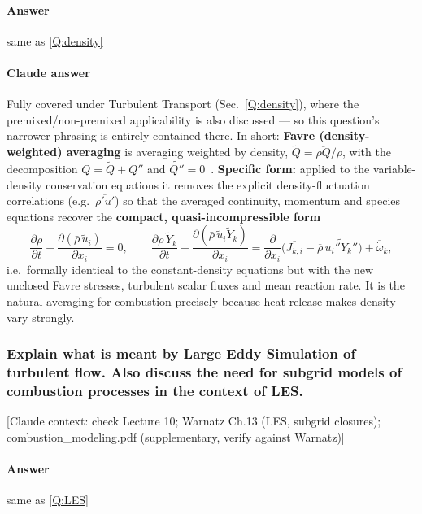 \paragraph{Answer} same as \ref{Q:density}

{\color{istblue}
\paragraph{Claude answer}
Fully covered under Turbulent Transport (Sec.~\ref{Q:density}), where the premixed/non-premixed applicability is also discussed --- so this question's narrower phrasing is entirely contained there. In short: \textbf{Favre (density-weighted) averaging} is averaging weighted by density, $\tilde Q = \overline{\rho Q}/\bar\rho$, with the decomposition $Q = \tilde Q + Q''$ and $\widetilde{Q''}=0$~\cite{lecture10,veynante2002turbulent,warnatz2006combustion}. \textbf{Specific form:} applied to the variable-density conservation equations it removes the explicit density-fluctuation correlations (e.g.\ $\overline{\rho'u'}$) so that the averaged continuity, momentum and species equations recover the \textbf{compact, quasi-incompressible form}
\begin{equation*}
\frac{\partial \bar\rho}{\partial t} + \frac{\partial(\bar\rho\,\tilde u_i)}{\partial x_i} = 0, \qquad
\frac{\partial \bar\rho\,\tilde Y_k}{\partial t} + \frac{\partial(\bar\rho\,\tilde u_i\tilde Y_k)}{\partial x_i} = \frac{\partial}{\partial x_i}\Big(\overline{J_{k,i}} - \overline{\rho}\,\widetilde{u_i''Y_k''}\Big) + \overline{\dot\omega}_k,
\end{equation*}
i.e.\ formally identical to the constant-density equations but with the new unclosed Favre stresses, turbulent scalar fluxes and mean reaction rate. It is the natural averaging for combustion precisely because heat release makes density vary strongly.
}




\subsubsection{Explain what is meant by Large Eddy Simulation of turbulent flow. Also discuss the need for subgrid models of combustion processes in the context of LES.}

{\color{gray}\footnotesize [Claude context: check Lecture 10; Warnatz Ch.13 (LES, subgrid closures); combustion\_modeling.pdf (supplementary, verify against Warnatz)]}

\paragraph{Answer} same as \ref{Q:LES}

